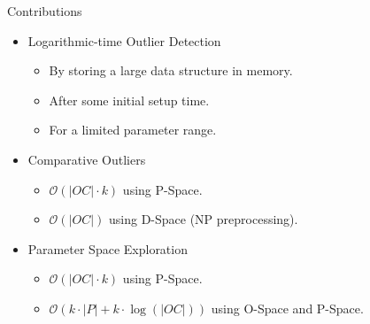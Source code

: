 \documentclass{beamer}
\begin{document}
    \begin{frame}{Contributions}
        \begin{itemize}
            \item Logarithmic-time Outlier Detection 
               \begin{itemize}
                    \item By storing a large data structure in memory.
                    \item After some initial setup time.
                    \item For a limited parameter range.
                \end{itemize}
           \item Comparative Outliers
                \begin{itemize}
                    \item $\mathcal{O}(|OC| \cdot k)$ using P-Space.
                    \item  $\mathcal{O}(|OC|)$ using D-Space (NP preprocessing).
                \end{itemize}
            \item Parameter Space Exploration
                    \begin{itemize}
                    \item $\mathcal{O}(|OC| \cdot k)$ using P-Space.
                    \item $\mathcal{O}(k\cdot |P| + k \cdot \log(|OC|))$ using O-Space and P-Space.
                   \end{itemize}
        \end{itemize}
    \end{frame}
    
\end{document}
